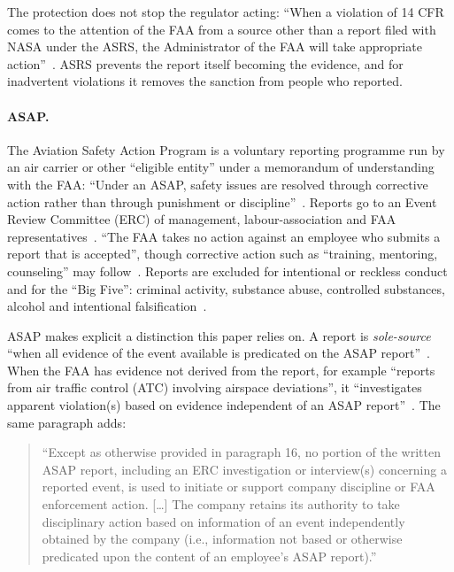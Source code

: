 \documentclass[11pt]{article}
\begin{document}
The protection does not stop the regulator acting: ``When a violation of 14 CFR comes to the attention of the FAA from a source other than a report filed with NASA under the ASRS, the Administrator of the FAA will take appropriate action''~\cite[para.~8.3]{faa2021}. ASRS prevents the report itself becoming the evidence, and for inadvertent violations it removes the sanction from people who reported.

\paragraph{ASAP.} The Aviation Safety Action Program is a voluntary reporting programme run by an air carrier or other ``eligible entity'' under a memorandum of understanding with the FAA: ``Under an ASAP, safety issues are resolved through corrective action rather than through punishment or discipline''~\cite[para.~1]{faa2020}. Reports go to an Event Review Committee (ERC) of management, labour-association and FAA representatives~\cite[para.~A.8]{faa2020}. ``The FAA takes no action against an employee who submits a report that is accepted'', though corrective action such as ``training, mentoring, counseling'' may follow~\cite[paras.~15, 16.1]{faa2020}. Reports are excluded for intentional or reckless conduct and for the ``Big Five'': criminal activity, substance abuse, controlled substances, alcohol and intentional falsification~\cite[paras.~18.2--18.4, A.4]{faa2020}.

ASAP makes explicit a distinction this paper relies on. A report is \emph{sole-source} ``when all evidence of the event available is predicated on the ASAP report''~\cite[para.~A.20]{faa2020}. When the FAA has evidence not derived from the report, for example ``reports from air traffic control (ATC) involving airspace deviations'', it ``investigates apparent violation(s) based on evidence independent of an ASAP report''~\cite[para.~16.4]{faa2020}. The same paragraph adds:

\begin{quote}
``Except as otherwise provided in paragraph 16, no portion of the written ASAP report, including an ERC investigation or interview(s) concerning a reported event, is used to initiate or support company discipline or FAA enforcement action. {[}\ldots{]} The company retains its authority to take disciplinary action based on information of an event independently obtained by the company (i.e., information not based or otherwise predicated upon the content of an employee's ASAP report).'' \cite[para.~16.4, Note]{faa2020}
\end{quote}
\end{document}
